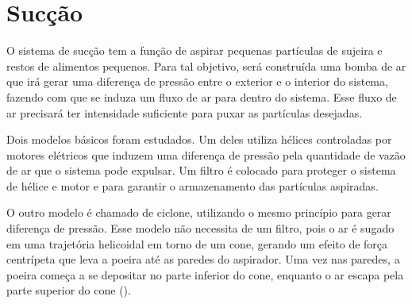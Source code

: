 \section{Sucção} %
\label{sub:aspirador}
	
	O sistema de sucção tem a função de aspirar pequenas partículas de sujeira e restos de alimentos pequenos. Para tal objetivo, será construída uma bomba de ar que irá gerar uma diferença de pressão entre o exterior e o interior do sistema, fazendo com que se induza um fluxo de ar para dentro do sistema. Esse fluxo de ar precisará ter intensidade suficiente para puxar as partículas desejadas. 

	Dois modelos básicos foram estudados. Um deles utiliza hélices controladas por motores elétricos que induzem uma diferença de pressão pela quantidade de vazão de ar que o sistema pode expulsar.  Um filtro é colocado para proteger o sistema de hélice e motor e para garantir o armazenamento das partículas aspiradas.

	O outro modelo é chamado de ciclone, utilizando o mesmo princípio para gerar diferença de pressão. Esse modelo não necessita de um filtro, pois o ar é sugado em uma trajetória helicoidal em torno de um cone, gerando um efeito de força centrípeta que leva a poeira até as paredes do aspirador. Uma vez nas paredes, a poeira começa a se depositar no parte inferior do cone, enquanto o ar escapa pela parte superior do cone (\cite{layton}).

